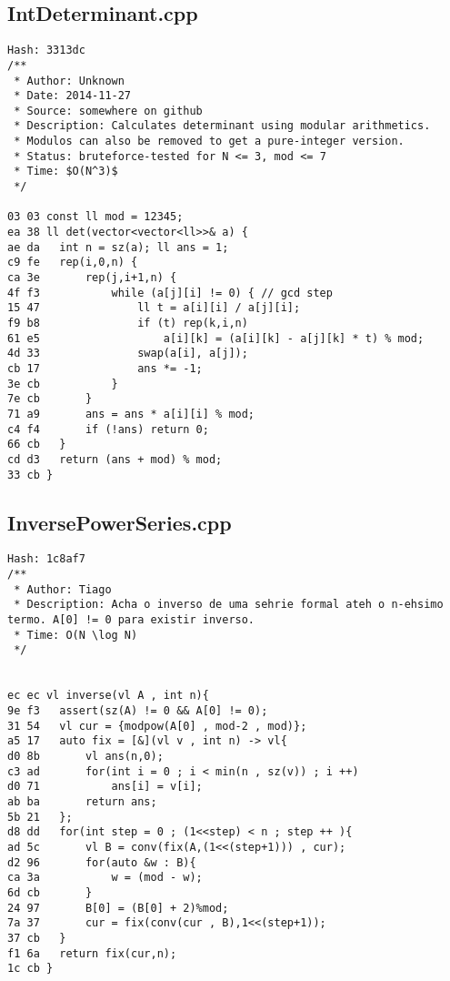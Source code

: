 \documentclass[11pt, a4paper, twoside]{article}
\begin{document}
\subsection{IntDeterminant.cpp}
\begin{lstlisting}
Hash: 3313dc
/**
 * Author: Unknown
 * Date: 2014-11-27
 * Source: somewhere on github
 * Description: Calculates determinant using modular arithmetics.
 * Modulos can also be removed to get a pure-integer version.
 * Status: bruteforce-tested for N <= 3, mod <= 7
 * Time: $O(N^3)$
 */

03 03 const ll mod = 12345;
ea 38 ll det(vector<vector<ll>>& a) {
ae da 	int n = sz(a); ll ans = 1;
c9 fe 	rep(i,0,n) {
ca 3e 		rep(j,i+1,n) {
4f f3 			while (a[j][i] != 0) { // gcd step
15 47 				ll t = a[i][i] / a[j][i];
f9 b8 				if (t) rep(k,i,n)
61 e5 					a[i][k] = (a[i][k] - a[j][k] * t) % mod;
4d 33 				swap(a[i], a[j]);
cb 17 				ans *= -1;
3e cb 			}
7e cb 		}
71 a9 		ans = ans * a[i][i] % mod;
c4 f4 		if (!ans) return 0;
66 cb 	}
cd d3 	return (ans + mod) % mod;
33 cb }
\end{lstlisting}

\subsection{InversePowerSeries.cpp}
\begin{lstlisting}
Hash: 1c8af7
/**
 * Author: Tiago
 * Description: Acha o inverso de uma sehrie formal ateh o n-ehsimo termo. A[0] != 0 para existir inverso.
 * Time: O(N \log N)
 */


ec ec vl inverse(vl A , int n){
9e f3 	assert(sz(A) != 0 && A[0] != 0);
31 54 	vl cur = {modpow(A[0] , mod-2 , mod)};
a5 17 	auto fix = [&](vl v , int n) -> vl{
d0 8b 		vl ans(n,0);
c3 ad 		for(int i = 0 ; i < min(n , sz(v)) ; i ++)
d0 71 			ans[i] = v[i];
ab ba 		return ans;
5b 21 	};
d8 dd 	for(int step = 0 ; (1<<step) < n ; step ++ ){
ad 5c 		vl B = conv(fix(A,(1<<(step+1))) , cur);
d2 96 		for(auto &w : B){
ca 3a 			w = (mod - w);
6d cb 		}
24 97 		B[0] = (B[0] + 2)%mod;
7a 37 		cur = fix(conv(cur , B),1<<(step+1));
37 cb 	}
f1 6a 	return fix(cur,n);
1c cb }
\end{lstlisting}
\end{document}
